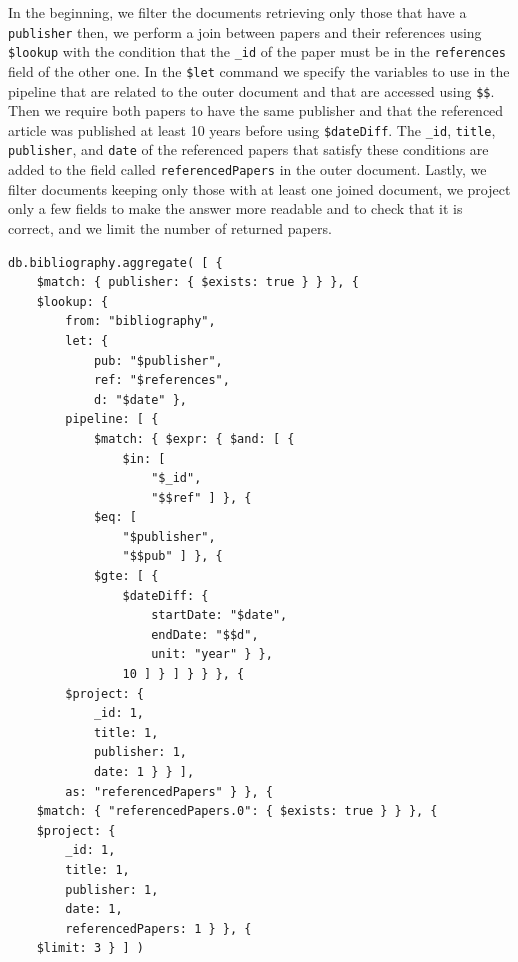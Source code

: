 \begin{enumerate}
    In the beginning, we filter the documents retrieving only those that have a \verb|publisher| then, we perform a join between papers and their references using \verb|$lookup| with the condition that the \verb|_id| of the paper must be in the \verb|references| field of the other one.
    In the \verb|$let| command we specify the variables to use in the pipeline that are related to the outer document and that are accessed using \verb|$$|.
    Then we require both papers to have the same publisher and that the referenced article was published at least 10 years before using \verb|$dateDiff|.
    The \verb|_id|, \verb|title|, \verb|publisher|, and \verb|date| of the referenced papers that satisfy these conditions are added to the field called \verb|referencedPapers| in the outer document.
    Lastly, we filter documents keeping only those with at least one joined document, we project only a few fields to make the answer more readable and to check that it is correct, and we limit the number of returned papers.
    \begin{lstlisting}[label={lst:lstlisting73}]
db.bibliography.aggregate( [ {
    $match: { publisher: { $exists: true } } }, {
    $lookup: {
        from: "bibliography",
        let: {
            pub: "$publisher",
            ref: "$references",
            d: "$date" },
        pipeline: [ {
            $match: { $expr: { $and: [ {
                $in: [
                    "$_id",
                    "$$ref" ] }, {
            $eq: [
                "$publisher",
                "$$pub" ] }, {
            $gte: [ {
                $dateDiff: {
                    startDate: "$date",
                    endDate: "$$d",
                    unit: "year" } },
                10 ] } ] } } }, {
        $project: {
            _id: 1,
            title: 1,
            publisher: 1,
            date: 1 } } ],
        as: "referencedPapers" } }, {
    $match: { "referencedPapers.0": { $exists: true } } }, {
    $project: {
        _id: 1,
        title: 1,
        publisher: 1,
        date: 1,
        referencedPapers: 1 } }, {
    $limit: 3 } ] )
    \end{lstlisting}
    \begin{figure}[H]
        \begin{center}

\end{center}
\end{figure}
\end{enumerate}

